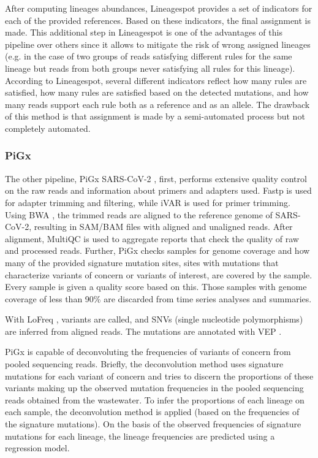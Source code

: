         After computing lineages abundances, Lineagespot provides a set of indicators for each of the provided references. Based on these indicators, the final assignment is made. This additional step in Lineagespot is one of the advantages of this pipeline over others since it allows to mitigate the risk of wrong assigned lineages (e.g. in the case of two groups of reads satisfying different rules for the same lineage but reads from both groups never satisfying all rules for this lineage). According to Lineagespot, several different indicators reflect how many rules are satisfied, how many rules are satisfied based on the detected mutations, and how many reads support each rule both as a reference and as an allele. The drawback of this method is that assignment is made by a semi-automated process but not completely automated.
        
        
        \subsubsection{PiGx}
        The other pipeline, PiGx SARS-CoV-2 \cite{schumann2021}, first, performs extensive quality control on the raw reads and information about primers and adapters used. Fastp \cite{chen2018} is used for adapter trimming and filtering, while iVAR is used for primer trimming. Using BWA \cite{li2013}, the trimmed reads are aligned to the reference genome of SARS-CoV-2, resulting in SAM/BAM files with aligned and unaligned reads. After alignment, MultiQC \cite{multiqc} is used to aggregate reports that check the quality of raw and processed reads. Further, PiGx checks samples for genome coverage and how many of the provided signature mutation sites, sites with mutations that characterize variants of concern or variants of interest, are covered by the sample. Every sample is given a quality score based on this. Those samples with genome coverage of less than 90\% are discarded from time series analyses and summaries.

        With LoFreq \cite{lofreq}, variants are called, and SNVs (single nucleotide polymorphisms) are inferred from aligned reads. The mutations are annotated with VEP \cite{mclaren2016}. 
        
        PiGx is capable of deconvoluting the frequencies of variants of concern from pooled sequencing reads. Briefly, the deconvolution method uses signature mutations for each variant of concern and tries to discern the proportions of these variants making up the observed mutation frequencies in the pooled sequencing reads obtained from the wastewater. To infer the proportions of each lineage on each sample, the deconvolution method is applied (based on the frequencies of the signature mutations). On the basis of the observed frequencies of signature mutations for each lineage, the lineage frequencies are predicted using a regression model. 
        
